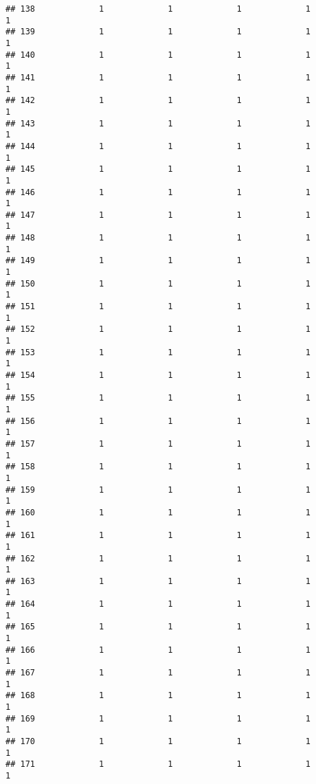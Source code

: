 \documentclass[
]{article}
\begin{document}
\begin{verbatim}
## 138             1             1             1             1             1
## 139             1             1             1             1             1
## 140             1             1             1             1             1
## 141             1             1             1             1             1
## 142             1             1             1             1             1
## 143             1             1             1             1             1
## 144             1             1             1             1             1
## 145             1             1             1             1             1
## 146             1             1             1             1             1
## 147             1             1             1             1             1
## 148             1             1             1             1             1
## 149             1             1             1             1             1
## 150             1             1             1             1             1
## 151             1             1             1             1             1
## 152             1             1             1             1             1
## 153             1             1             1             1             1
## 154             1             1             1             1             1
## 155             1             1             1             1             1
## 156             1             1             1             1             1
## 157             1             1             1             1             1
## 158             1             1             1             1             1
## 159             1             1             1             1             1
## 160             1             1             1             1             1
## 161             1             1             1             1             1
## 162             1             1             1             1             1
## 163             1             1             1             1             1
## 164             1             1             1             1             1
## 165             1             1             1             1             1
## 166             1             1             1             1             1
## 167             1             1             1             1             1
## 168             1             1             1             1             1
## 169             1             1             1             1             1
## 170             1             1             1             1             1
## 171             1             1             1             1             1

\end{verbatim}
\end{document}
